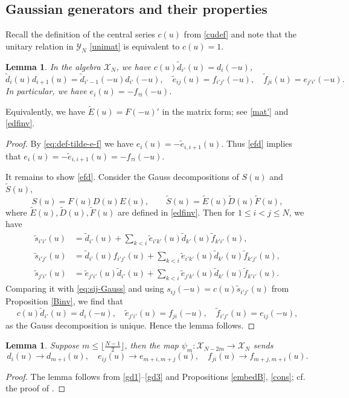 \documentclass[11pt,reqno]{amsart}
\numberwithin{equation}{section}
\newtheorem{lem}[thm]{Lemma}
\theoremstyle{definition}
\theoremstyle{remark}
\newcommand{\beq}{\begin{equation}}
\newcommand{\eeq}{\end{equation}}
\newcommand{\tl}{\tilde}
\newcommand{\wtl}{\widetilde}
\newcommand{\lle}{\leqslant}
\newcommand{\Y}{{\mathscr{Y}}}
\newcommand{\scrX}{{\mathscr{X}}}
\begin{document}
\subsection{Gaussian generators and their properties}
Recall the definition of the central series $c(u)$ from \eqref{cudef} and note that the unitary relation in $\Y_N$ \eqref{unimat} is equivalent to $c(u)=1$.

\begin{lem}\label{efaiii}
In the algebra $\scrX_N$, we have $c(u)\tl d_{i'}(u)=d_{i}(-u)$,
\beq\label{efd}
\tl d_i(u)d_{i+1}(u)=\tl d_{i'-1}(-u)d_{i'}(-u),\quad  \tl e_{ij}(u)=f_{i'j'}(-u), \quad  \tl f_{ji}(u)=e_{j'i'}(-u).
\eeq
In particular, we have $e_{i}(u)=-f_{\tau i}(-u)$.
\end{lem}

Equivalently, we have $\wtl E(u)=F(-u)'$ in the matrix form; see \eqref{mat'} and \eqref{edfinv}. 

\begin{proof}
By \eqref{eq:def-tilde-e-f} we have $e_{i}(u)=-\tl e_{i,i+1}(u)$. Thus \eqref{efd} implies that $e_{i}(u)=-\tl e_{i,i+1}(u)=-f_{\tau i}(-u)$.

It remains to show \eqref{efd}. Consider the Gauss decompositions of $S(u)$ and $\wtl S(u)$,
\[
S(u)=F(u)D(u)E(u),\qquad \wtl S(u)=\wtl E(u) \wtl D(u)\wtl F(u),
\]
where $\wtl E(u), \wtl D(u), \wtl F(u)$ are defined in \eqref{edfinv}. Then for $1\lle i<j\lle N$, we have
\begin{align*}
\tl s_{i'i'}(u)&=\tl d_{i'}(u)+\sum_{k<i}\tl e_{i'k'}(u)\tl d_{k'}(u)\tl f_{k'i'}(u),\nonumber\\
\tl s_{i'j'}(u)&=\tl d_{i'}(u)f_{i'j'}(u)+\sum_{k<i}\tl e_{i'k'}(u)\tl d_{k'}(u)\tl f_{k'j'}(u),\\
\tl s_{j'i'}(u)&=\tl e_{j'i'}(u)\tl d_{i'}(u)+\sum_{k<i}\tl e_{j'k'}(u)\tl d_{k'}(u)\tl f_{k'i'}(u).\nonumber
\end{align*}
Comparing it with \eqref{eq:sij-Gauss} and using $s_{ij}(-u)=c(u)\tl s_{i'j'}(u)$ from Proposition \ref{Binv}, we find that
\[
c(u)\tl d_{i'}(u)=d_{i}(-u),\quad \tl e_{j'i'}(u)=f_{ji}(-u),\quad \tl f_{i'j'}(u)=e_{ij}(-u),
\]
as the Gauss decomposition is unique. Hence the lemma follows.
\end{proof}

\begin{lem}\label{shiftlem}
Suppose $m\lle \lfloor \tfrac{N-1}{2}\rfloor$, then the map $\psi_m:\scrX_{N-2m}\to \scrX_N$ sends
\[
d_i(u)\to d_{m+i}(u),\quad e_{ij}(u)\to e_{m+i,m+j}(u),\quad f_{ji}(u)\to f_{m+j,m+i}(u).
\]
\end{lem}
\begin{proof}
The lemma follows from \eqref{gd1}--\eqref{gd3} and Propositions \ref{embedB}, \ref{cons}; cf. the proof of \cite[Coro. 3.2]{KLWZ23a}.
\end{proof}
\end{document}
